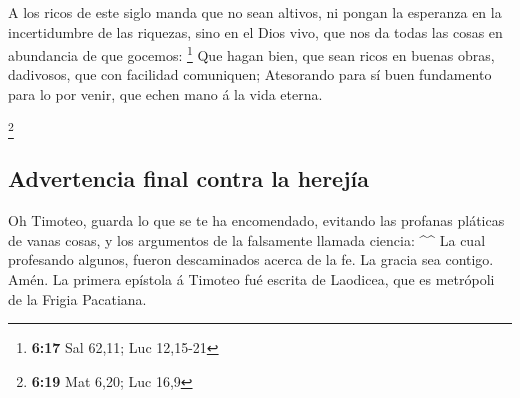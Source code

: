  A los ricos de este siglo manda que no sean altivos, ni
pongan la esperanza en la incertidumbre de las riquezas, sino en el Dios
vivo, que nos da todas las cosas en abundancia de que gocemos:
\footnote{\textbf{6:17} Sal 62,11; Luc 12,15-21}  Que hagan
bien, que sean ricos en buenas obras, dadivosos, que con facilidad
comuniquen;  Atesorando para sí buen fundamento para lo por
venir, que echen mano á la vida eterna.

\footnote{\textbf{6:19} Mat 6,20; Luc 16,9}

\hypertarget{advertencia-final-contra-la-herejuxeda}{%
\subsection{Advertencia final contra la
herejía}\label{advertencia-final-contra-la-herejuxeda}}

 Oh Timoteo, guarda lo que se te ha encomendado, evitando
las profanas pláticas de vanas cosas, y los argumentos de la falsamente
llamada ciencia: \^{}\^{}  La cual profesando algunos,
fueron descaminados acerca de la fe. La gracia sea contigo. Amén. La
primera epístola á Timoteo fué escrita de Laodicea, que es metrópoli de
la Frigia Pacatiana.

